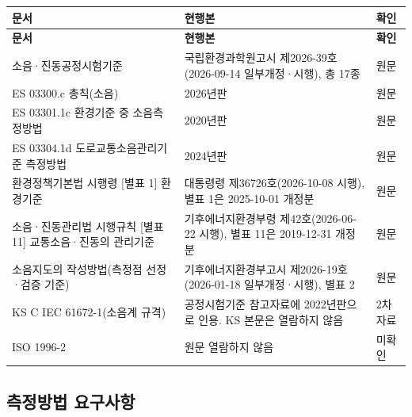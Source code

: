 \documentclass[10.5pt,a4paper]{article}
\newcommand{\hd}[1]{\cellcolor{headfill}\textbf{\sffamily #1}}
\begin{document}
\begin{longtable}{>{\raggedright\arraybackslash}p{}>{\raggedright\arraybackslash}p{}>{\raggedright\arraybackslash}p{}}
\toprule
\hd{문서} & \hd{현행본} & \hd{확인} \\ \midrule
\endfirsthead
\toprule
\hd{문서} & \hd{현행본} & \hd{확인} \\ \midrule
\endhead
\bottomrule
\endlastfoot
소음·진동공정시험기준 & 국립환경과학원고시 제2026-39호(2026-09-14 일부개정·시행), 총 17종 & 원문 \\ \midrule
ES 03300.c 총칙(소음) & 2026년판 & 원문 \\ \midrule
ES 03301.1c 환경기준 중 소음측정방법 & 2020년판 & 원문 \\ \midrule
ES 03304.1d 도로교통소음관리기준 측정방법 & 2024년판 & 원문 \\ \midrule
환경정책기본법 시행령 [별표 1] 환경기준 & 대통령령 제36726호(2026-10-08 시행), 별표 1은 2025-10-01 개정분 & 원문 \\ \midrule
소음·진동관리법 시행규칙 [별표 11] 교통소음·진동의 관리기준 & 기후에너지환경부령 제42호(2026-06-22 시행), 별표 11은 2019-12-31 개정분 & 원문 \\ \midrule
소음지도의 작성방법(측정점 선정·검증 기준) & 기후에너지환경부고시 제2026-19호(2026-01-18 일부개정·시행), 별표 2 & 원문 \\ \midrule
KS C IEC 61672-1(소음계 규격) & 공정시험기준 참고자료에 2022년판으로 인용. KS 본문은 열람하지 않음 & 2차 자료 \\ \midrule
ISO 1996-2 & 원문 열람하지 않음 & 미확인 \\
\end{longtable}
\addtocounter{table}{-1}
\normalsize
{}\subsection{측정방법 요구사항}
\footnotesize
\end{document}

